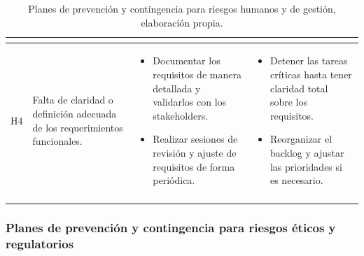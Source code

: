 \begin{longtable}{|>{\centering\arraybackslash}p{0.8cm}|>{\raggedright\arraybackslash}p{3.5cm}|>{\raggedright\arraybackslash}p{5.1cm}|>{\raggedright\arraybackslash}p{5.1cm}|}
\begin{itemize}
	\end{itemize} \\
	\hline
	H4 & Falta de claridad o definición adecuada de los requerimientos funcionales. &
	\begin{itemize}
		\item Documentar los requisitos de manera detallada y validarlos con los stakeholders.
		\item Realizar sesiones de revisión y ajuste de requisitos de forma periódica.
	\end{itemize} &
	\begin{itemize}
		\item Detener las tareas críticas hasta tener claridad total sobre los requisitos.
		\item Reorganizar el backlog y ajustar las prioridades si es necesario.
	\end{itemize} \\
	\hline
	\caption[Planes de prevención y contingencia para riesgos humanos y de gestión]{Planes de prevención y contingencia para riesgos humanos y de gestión, elaboración propia.} 	\label{tab:riesgos_humanos}\\
\end{longtable}

\subsubsection{Planes de prevención y contingencia para riesgos éticos y regulatorios}

\setlength{\tabcolsep}{4pt}
\renewcommand{\arraystretch}{1.2}

